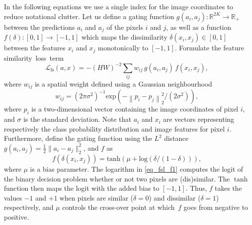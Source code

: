 \documentclass{article}
\begin{document}
In the following equations we use a single index for the image coordinates to reduce notational clutter. Let us define a gating function $g(a_i, a_j) : \mathbb{R}^{2K} \rightarrow \mathbb{R}_+$ between the predictions $a_i$ and $a_j$ of the pixels $i$ and $j$, as well as a function $f( \delta ) : [0, 1] \rightarrow [-1, 1]$ which maps the dissimilarity $\delta(x_i, x_j) \in [0, 1]$ between the features $x_i$ and $x_j$ monotonically to $[-1, 1]$. Formulate the feature similarity~loss~term
\begin{equation}
	\label{eq_fsl_loss}
	\mathcal{L}_{\mathrm{fs}}(a, x) = -(HW)^{-2}{\textstyle\sum}_{ij} w_{ij} \, g(a_i, a_j) \, f(x_i, x_j),
\end{equation}
where $w_{ij}$ is a spatial weight defined using a Gaussian neighbourhood
\begin{equation}
	\label{eq_gauss_weights}
	w_{ij} = (2 \pi \sigma^2)^{-1} \text{exp} \left( -\left\lVert p_i - p_j \right\rVert^2_2 / (2 \sigma^2) \right),
\end{equation}
where $p_i$ is a two-dimensional vector containing the image coordinates of pixel $i$, and $\sigma$ is the standard deviation. Note that $a_i$ and $x_i$ are vectors representing respectively the class probability distribution and image features for pixel $i$. Furthermore, define the gating function using the $L^2$ distance ${g(a_i, a_j) = \frac{1}{2} \lVert a_i - a_j \rVert_2^2}$, and $f$ as
\begin{equation}
	\label{eq_fsl_f1}
	f(\delta(x_i, x_j)) = \text{tanh} \left( \mu + \text{log} \left( \delta / (1 - \delta) \right) \right),
\end{equation}
where $\mu$ is a bias parameter. The logarithm in \eqref{eq_fsl_f1} computes the logit of the binary decision problem whether or not two pixels are (dis)similar. The $\tanh$ function then maps the logit with the added bias to $[-1, 1]$. Thus, $f$ takes the values $-1$ and $+1$ when pixels are similar ($\delta=0$) and dissimilar ($\delta=1$) respectively, and $\mu$ controls the cross-over point at which~$f$ goes from negative to positive.
\end{document}
